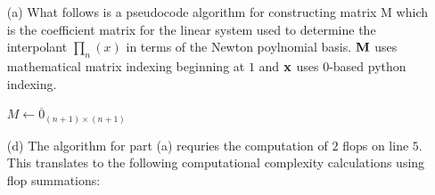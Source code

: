 \documentclass{article}
\begin{document}
\begin{enumerate}

    \item[(a)]  What follows is a pseudocode algorithm for constructing matrix M which is the coefficient matrix for
                the linear system used to determine the interpolant $\mathit{\prod_{n}}(x)$ in terms of the Newton
                poylnomial basis. $\bf{M}$ uses mathematical matrix indexing beginning at $1$ and $\bf{x}$ uses $0$-based python indexing.

                \begin{algorithm}[H]
                    \LinesNumbered
                    
                        
                        $M \leftarrow \overline{0}_{(n+1)\times(n+1)}$\\
                        
                \end{algorithm}
                \newpage

    \item[(d)]  The algorithm for part (a) requries the computation of $2$ flops on line $5$.
                This translates to the following computational complexity calculations using flop summations:


\end{enumerate}
\end{document}
